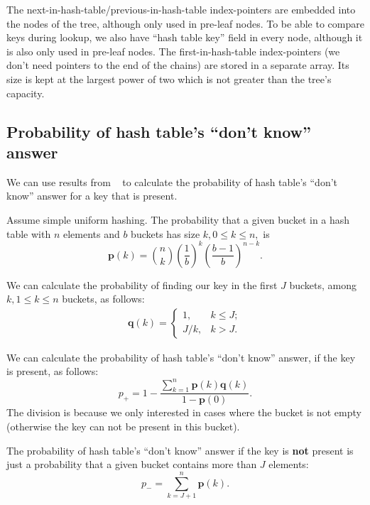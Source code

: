 \documentclass[a4paper,12pt]{article}
\begin{document}
The next-in-hash-table/previous-in-hash-table index-pointers are embedded into the nodes of the tree, although only used in pre-leaf nodes.
To be able to compare keys during lookup, we also have ``hash table key'' field in every node, although it is also only used in pre-leaf nodes.
The first-in-hash-table index-pointers (we don't need pointers to the end of the chains) are stored in a separate array.
Its size is kept at the largest power of two which is not greater than the tree's capacity.

\subsection{Probability of hash table's ``don't know'' answer}

We can use results from ~\cite{ht_analysis} to calculate the probability of hash table's ``don't know'' answer for a key that is present.

Assume simple uniform hashing.
The probability that a given bucket in a hash table with $n$ elements and $b$ buckets has size $k, 0 \le k \le n,$ is
$$
\mathbf{p}(k) = \binom{n}{k} \left( \frac{1}{b} \right)^k \left( \frac{b-1}{b} \right)^{n-k}.
$$

We can calculate the probability of finding our key in the first $J$ buckets, among $k, 1 \le k \le n$ buckets, as follows:
\begin{align*}
\mathbf{q}(k) = \begin{cases}
    1,   & k \le J; \\
    J/k, & k > J.
\end{cases}
\end{align*}

We can calculate the probability of hash table's ``don't know'' answer, if the key is present, as follows:
$$
p_+ = 1 - \frac{ \sum\limits_{k=1}^{n} \mathbf{p}(k) \mathbf{q}(k) }{ 1 - \mathbf{p}(0) }.
$$
The division is because we only interested in cases where the bucket is not empty (otherwise the key can not be present in this bucket).

The probability of hash table's ``don't know'' answer if the key is \textbf{not} present is just a probability that
a given bucket contains more than $J$ elements:
$$
p_- = \sum\limits_{k=J+1}^{n} \mathbf{p}(k).
$$
\end{document}
